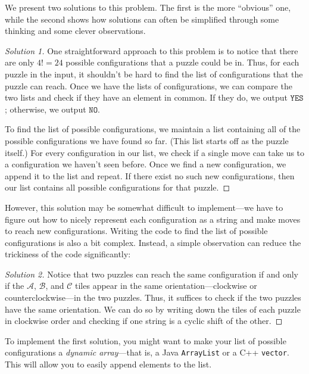 \clearpage

We present two solutions to this problem. The first is the more ``obvious'' one, while the second shows how solutions can often be simplified through some thinking and some clever observations.

\begin{proof}[Solution 1]
  One straightforward approach to this problem is to notice that there are only $4! = 24$ possible  configurations that a puzzle could be in. Thus, for each puzzle in the input, it shouldn't be hard to find the list of configurations that the puzzle can reach. Once we have the lists of configurations, we can compare the two lists and check if they have an element in common. If they do, we output $\mathtt{YES}$; otherwise, we output $\mathtt{NO}$.

  To find the list of possible configurations, we maintain a list containing all of the possible configurations we have found so far. (This list starts off as the puzzle itself.) For every configuration in our list, we check if a single move can take us to a configuration we haven't seen before. Once we find a new configuration, we append it to the list and repeat. If there exist no such new configurations, then our list contains all possible configurations for that puzzle.
\end{proof}

However, this solution may be somewhat difficult to implement---we have to figure out how to nicely represent each configuration as a string and make moves to reach new configurations. Writing the code to find the list of possible configurations is also a bit complex. Instead, a simple observation can reduce the trickiness of the code significantly:

\begin{proof}[Solution 2]
  Notice that two puzzles can reach the same configuration if and only if the $\mathcal A$, $\mathcal B$, and $\mathcal C$ tiles appear in the same orientation---clockwise or counterclockwise---in the two puzzles. Thus, it suffices to check if the two puzzles have the same orientation. We can do so by writing down the tiles of each puzzle in clockwise order and checking if one string is a cyclic shift of the other.
\end{proof}

To implement the first solution, you might want to make your list of possible configurations a \emph{dynamic array}---that is, a Java \texttt{ArrayList} or a C++ \texttt{vector}. This will allow you to easily append elements to the list.


